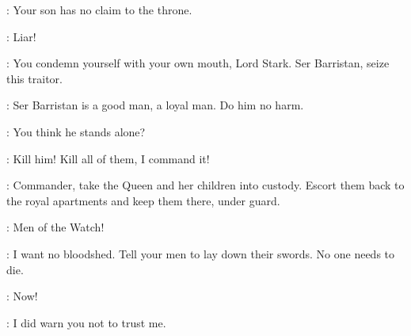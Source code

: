 \NED: Your son has no claim to the throne. 

\JOFFREY: Liar! 

\CERSEI: You condemn yourself with your own mouth, Lord Stark. Ser Barristan, seize this traitor. 

\NED:  Ser Barristan is a good man, a loyal man. Do him no harm. 

\CERSEI: You think he stands alone? 

\JOFFREY: Kill him! Kill all of them, I command it! 

\NED: Commander, take the Queen and her children into custody. Escort them back to the royal apartments and keep them there, under guard. 

\GOLDCLOAK: Men of the Watch! 

\NED: I want no bloodshed. Tell your men to lay down their swords. No one needs to die. 

\GOLDCLOAK: Now! 



\LITTLEFINGER: I did warn you not to trust me. 


